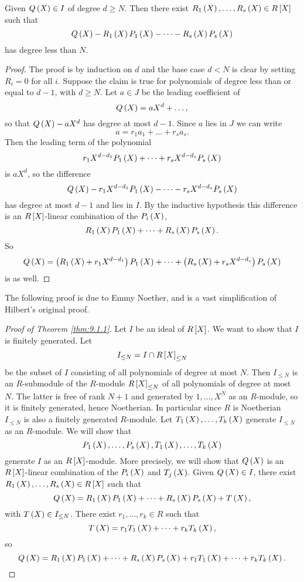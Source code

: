 \begin{lemma}
Given $ Q\rb{X} \in I $ of degree $ d \ge N $. Then there exist $ R_1\rb{X}, \dots, R_s\rb{X} \in R\sb{X} $ such that
$$ Q\rb{X} - R_1\rb{X}P_1\rb{X} - \dots - R_s\rb{X}P_s\rb{X} $$
has degree less than $ N $.
\end{lemma}

\begin{proof}
The proof is by induction on $ d $ and the base case $ d < N $ is clear by setting $ R_i = 0 $ for all $ i $. Suppose the claim is true for polynomials of degree less than or equal to $ d - 1 $, with $ d \ge N $. Let $ a \in J $ be the leading coefficient of
$$ Q\rb{X} = aX^d + \dots, $$
so that $ Q\rb{X} - aX^d $ has degree at most $ d - 1 $. Since $ a $ lies in $ J $ we can write
$$ a = r_1a_1 + \dots + r_sa_s. $$
Then the leading term of the polynomial
$$ r_1X^{d - d_1}P_1\rb{X} + \dots + r_sX^{d - d_s}P_s\rb{X} $$
is $ aX^d $, so the difference
$$ Q\rb{X} - r_1X^{d - d_1}P_1\rb{X} - \dots - r_sX^{d - d_s}P_s\rb{X} $$
has degree at most $ d - 1 $ and lies in $ I $. By the inductive hypothesis this difference is an $ R\sb{X} $-linear combination of the $ P_i\rb{X} $,
$$ R_1\rb{X}P_1\rb{X} + \dots + R_s\rb{X}P_s\rb{X}. $$
So
$$ Q\rb{X} = \rb{R_1\rb{X} + r_1X^{d - d_1}}P_1\rb{X} + \dots + \rb{R_s\rb{X} + r_sX^{d - d_s}}P_s\rb{X} $$
is as well.
\end{proof}

The following proof is due to Emmy Noether, and is a vast simplification of Hilbert's original proof.

\begin{proof}[Proof of Theorem \ref{thm:9.1.1}]
Let $ I $ be an ideal of $ R\sb{X} $. We want to show that $ I $ is finitely generated. Let
$$ I_{\le N} = I \cap R\sb{X}_{\le N} $$
be the subset of $ I $ consisting of all polynomials of degree at most $ N $. Then $ I_{\le N} $ is an $ R $-submodule of the $ R $-module $ R\sb{X}_{\le N} $ of all polynomials of degree at most $ N $. The latter is free of rank $ N + 1 $ and generated by $ 1, \dots, X^N $ as an $ R $-module, so it is finitely generated, hence Noetherian. In particular since $ R $ is Noetherian $ I_{\le N} $ is also a finitely generated $ R $-module. Let $ T_1\rb{X}, \dots, T_k\rb{X} $ generate $ I_{\le N} $ as an $ R $-module. We will show that
$$ P_1\rb{X}, \dots, P_s\rb{X}, T_1\rb{X}, \dots, T_k\rb{X} $$
generate $ I $ as an $ R\sb{X} $-module. More precisely, we will show that $ Q\rb{X} $ is an $ R\sb{X} $-linear combination of the $ P_i\rb{X} $ and $ T_j\rb{X} $. Given $ Q\rb{X} \in I $, there exist $ R_1\rb{X}, \dots, R_s\rb{X} \in R\sb{X} $ such that
$$ Q\rb{X} = R_1\rb{X}P_1\rb{X} + \dots + R_s\rb{X}P_s\rb{X} + T\rb{X}, $$
with $ T\rb{X} \in I_{\le N} $. There exist $ r_1, \dots, r_k \in R $ such that
$$ T\rb{X} = r_1T_1\rb{X} + \dots + r_kT_k\rb{X}, $$
so
$$ Q\rb{X} = R_1\rb{X}P_1\rb{X} + \dots + R_s\rb{X}P_s\rb{X} + r_1T_1\rb{X} + \dots + r_kT_k\rb{X}. $$
\end{proof}

